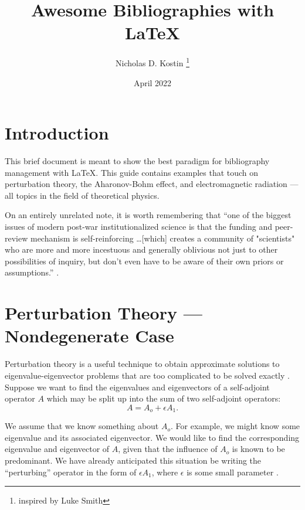 \documentclass{article}
\title{Awesome Bibliographies with {\LaTeX}}
\author{Nicholas D. Kostin \thanks{inspired by Luke Smith}}
\date{April 2022}
\numberwithin{equation}{section}
\begin{document}
\begin{titlepage}
\maketitle
\end{titlepage}


\section{Introduction}

This brief document is meant to show the best paradigm for bibliography management with {\LaTeX}. This guide contains examples that touch on perturbation theory, the Aharonov-Bohm effect, and electromagnetic radiation --- all topics in the field of theoretical physics.

\vspace{1em}

On an entirely unrelated note, it is worth remembering that ``one of the biggest issues of modern post-war institutionalized science is that the funding and peer-review mechanism is self-reinforcing \ldots [which] creates a community of "scientists" who are more and more incestuous and generally oblivious not just to other possibilities of inquiry, but don't even have to be aware of their own priors or assumptions.'' \cite{fragile}. 

\section{Perturbation Theory --- Nondegenerate Case}

Perturbation theory is a useful technique to obtain approximate solutions to eigenvalue-eigenvector problems that are too complicated to be solved exactly \cite{byronfuller}. Suppose we want to find the eigenvalues and eigenvectors of a self-adjoint operator $A$ which may be split up into the sum of two self-adjoint operators:
\begin{equation*}
    A = A_o + \epsilon A_1.
\end{equation*}

We assume that we know something about $A_o$. For example, we might know some eigenvalue and its associated eigenvector. We would like to find the corresponding eigenvalue and eigenvector of $A$, given that the influence of $A_o$ is known to be predominant. We have already anticipated this situation be writing the ``perturbing'' operator in the form of $\epsilon A_1$, where $\epsilon$ is some small parameter \cite{byronfuller}.
\end{document}
